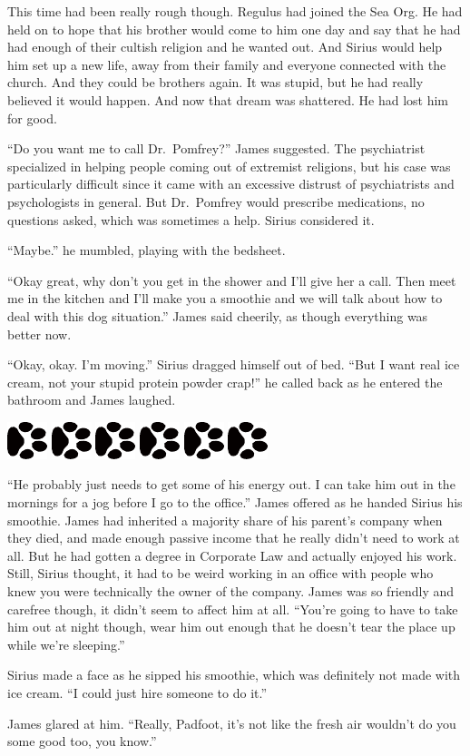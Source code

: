 \documentclass[12pt,twoside,openright]{memoir}
\newcommand{\myrulez}{	
	\begin{center}
		\hspace{.5em}
		\includegraphics[angle=60]{dogprint.pdf}
		\hspace{.5em}
		\includegraphics[angle=120]{dogprint.pdf}
		\hspace{.5em}
		\includegraphics[angle=60]{dogprint.pdf}
		\hspace{.5em}
		\includegraphics[angle=120]{dogprint.pdf}
		\hspace{.5em}
		\includegraphics[angle=60]{dogprint.pdf}
		\hspace{.5em}
		\includegraphics[angle=120]{dogprint.pdf}
		\hspace{.5em}
	\end{center}
}
\begin{document}
This time had been really rough though. Regulus had joined the Sea Org. He had held on to hope that his brother would come to him one day and say that he had had enough of their cultish religion and he wanted out. And Sirius would help him set up a new life, away from their family and everyone connected with the church. And they could be brothers again. It was stupid, but he had really believed it would happen. And now that dream was shattered. He had lost him for good.

``Do you want me to call Dr.\ Pomfrey?'' James suggested. The psychiatrist specialized in helping people coming out of extremist religions, but his case was particularly difficult since it came with an excessive distrust of psychiatrists and psychologists in general. But Dr.\ Pomfrey would prescribe medications, no questions asked, which was sometimes a help. Sirius considered it. 

``Maybe.'' he mumbled, playing with the bedsheet. 

``Okay great, why don't you get in the shower and I'll give her a call. Then meet me in the kitchen and I'll make you a smoothie and we will talk about how to deal with this dog situation.'' James said cheerily, as though everything was better now. 

``Okay, okay. I'm moving.'' Sirius dragged himself out of bed. ``But I want real ice cream, not your stupid protein powder crap!'' he called back as he entered the bathroom and James laughed.

\myrulez

``He probably just needs to get some of his energy out. I can take him out in the mornings for a jog before I go to the office.'' James offered as he handed Sirius his smoothie. James had inherited a majority share of his parent's company when they died, and made enough passive income that he really didn't need to work at all. But he had gotten a degree in Corporate Law and actually enjoyed his work. Still, Sirius thought, it had to be weird working in an office with people who knew you were technically the owner of the company. James was so friendly and carefree though, it didn't seem to affect him at all. ``You're going to have to take him out at night though, wear him out enough that he doesn't tear the place up while we're sleeping.''

Sirius made a face as he sipped his smoothie, which was definitely not made with ice cream. ``I could just hire someone to do it.''

James glared at him. ``Really, Padfoot, it's not like the fresh air wouldn't do you some good too, you know.''
\end{document}
